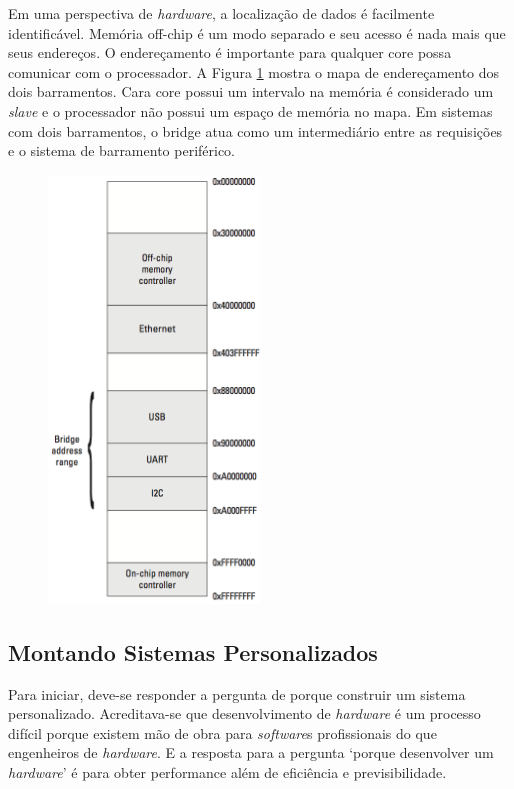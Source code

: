 Em uma perspectiva de \textit{hardware}, a localização de dados é facilmente identificável. Memória off-chip é um modo separado e seu acesso é nada mais que seus endereços. O endereçamento é importante para qualquer core possa comunicar com o processador. A Figura \ref{fig:f3-11} mostra o mapa de endereçamento dos dois barramentos. Cara core possui um intervalo na memória é considerado um \textit{\textit{slave}} e o processador não possui um espaço de memória no mapa. Em sistemas com dois barramentos, o bridge atua como um intermediário entre as requisições e o sistema de barramento periférico.

\begin{figure}[h] \centering
	\includegraphics[width=0.5\textwidth]{img/f3-11.png}
	\caption{}
	\label{fig:f3-11}
\end{figure}

\subsection{Montando Sistemas Personalizados}

Para iniciar, deve-se responder a pergunta de porque construir um sistema personalizado. Acreditava-se que desenvolvimento de \textit{hardware} é um processo difícil porque existem mão de obra para \textit{software}s profissionais do que engenheiros de \textit{hardware}. E a resposta para a pergunta ‘porque desenvolver um \textit{hardware}’ é para obter performance além de eficiência e previsibilidade.

